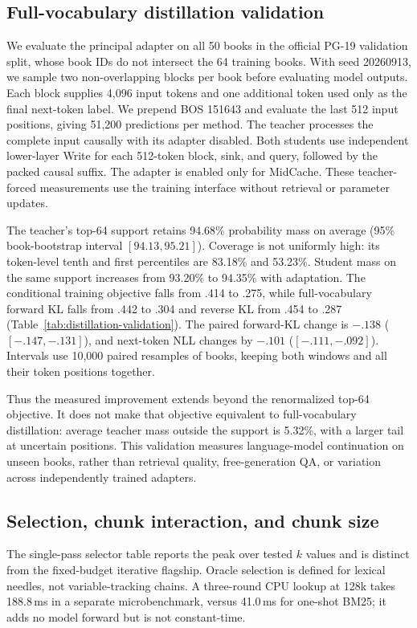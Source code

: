 \subsection{Full-vocabulary distillation validation}
\label{app:distillation-validation}

We evaluate the principal adapter on all 50 books in the official PG-19 validation split, whose book IDs do not intersect the 64 training books. With seed 20260913, we sample two non-overlapping blocks per book before evaluating model outputs. Each block supplies 4,096 input tokens and one additional token used only as the final next-token label. We prepend BOS 151643 and evaluate the last 512 input positions, giving 51,200 predictions per method. The teacher processes the complete input causally with its adapter disabled. Both students use independent lower-layer Write for each 512-token block, sink, and query, followed by the packed causal suffix. The adapter is enabled only for MidCache. These teacher-forced measurements use the training interface without retrieval or parameter updates.

The teacher's top-64 support retains 94.68\% probability mass on average (95\% book-bootstrap interval $[94.13,95.21]$). Coverage is not uniformly high: its token-level tenth and first percentiles are 83.18\% and 53.23\%. Student mass on the same support increases from 93.20\% to 94.35\% with adaptation. The conditional training objective falls from .414 to .275, while full-vocabulary forward KL falls from .442 to .304 and reverse KL from .454 to .287 (Table~\ref{tab:distillation-validation}). The paired forward-KL change is $-.138$ ($[-.147,-.131]$), and next-token NLL changes by $-.101$ ($[-.111,-.092]$). Intervals use 10,000 paired resamples of books, keeping both windows and all their token positions together.

Thus the measured improvement extends beyond the renormalized top-64 objective. It does not make that objective equivalent to full-vocabulary distillation: average teacher mass outside the support is 5.32\%, with a larger tail at uncertain positions. This validation measures language-model continuation on unseen books, rather than retrieval quality, free-generation QA, or variation across independently trained adapters.

\subsection{Selection, chunk interaction, and chunk size}



The single-pass selector table reports the peak over tested $k$ values and is distinct from the fixed-budget iterative flagship. Oracle selection is defined for lexical needles, not variable-tracking chains. A three-round CPU lookup at 128k takes 188.8\,ms in a separate microbenchmark, versus 41.0\,ms for one-shot BM25; it adds no model forward but is not constant-time.

